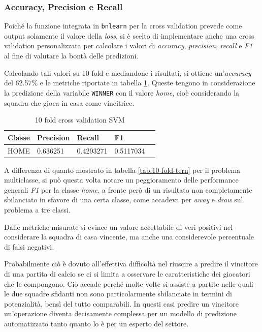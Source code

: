 \documentclass[hidelinks, 12pt]{article}
\begin{document}
\subsubsection{Accuracy, Precision e Recall}

Poiché la funzione integrata in \texttt{bnlearn} per la cross validation prevede come output solamente il valore della \textit{loss}, si è scelto di implementare anche una cross validation personalizzata per calcolare i valori di \textit{accuracy}, \textit{precision}, \textit{recall} e \textit{F1} al fine di valutare la bontà delle predizioni.

Calcolando tali valori su 10 fold e mediandone i risultati, si ottiene un'\textit{accuracy} del 62.57\% e le metriche riportate in tabella \ref{tab:10-fold-bin}. Queste tengono in considerazione la predizione della variabile \texttt{WINNER} con il valore \textit{home}, cioè considerando la squadra che gioca in casa come vincitrice.

\begin{table}[H]
	\centering
	\caption{10 fold cross validation SVM}
	\begin{tabular}{l|llll}
		\hline
		Classe & Precision & Recall & F1 \\
		\hline
		HOME & 0.636251 & 0.4293271 & 0.5117034  \\
		\hline
	\end{tabular}
	\label{tab:10-fold-bin}
\end{table}

A differenza di quanto mostrato in tabella \ref{tab:10-fold-tern} per il problema multiclasse, si può questa volta notare un peggioramento delle performance generali \textit{F1} per la classe \textit{home}, a fronte però di un risultato non completamente sbilanciato in sfavore di una certa classe, come accadeva per \textit{away} e \textit{draw} sul problema a tre classi.

Dalle metriche misurate si evince un valore accettabile di veri positivi nel considerare la squadra di casa vincente, ma anche una considerevole percentuale di falsi negativi.

Probabilmente ciò è dovuto all'effettiva difficoltà nel riuscire a predire il vincitore di una partita di calcio se ci si limita a osservare le caratteristiche dei giocatori che le compongono. Ciò accade perché molte volte si assiste a partite nelle quali le due squadre sfidanti non sono particolarmente sbilanciate in termini di potenzialità, bensì del tutto comparabili. In questi casi predire un vincitore un'operazione diventa decisamente complessa per un modello di predizione automatizzato tanto quanto lo è per un esperto del settore.
\end{document}
